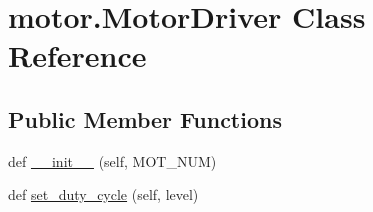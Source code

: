 \hypertarget{classmotor_1_1_motor_driver}{}\section{motor.\+Motor\+Driver Class Reference}
\label{classmotor_1_1_motor_driver}
\subsection*{Public Member Functions}
\begin{DoxyCompactItemize}
\item 
def \mbox{\hyperlink{classmotor_1_1_motor_driver_afdb79336d9a01da3225b1ce463a1b86f}{\+\_\+\+\_\+init\+\_\+\+\_\+}} (self, M\+O\+T\+\_\+\+N\+UM)
\item 
def \mbox{\hyperlink{classmotor_1_1_motor_driver_a51b4721406aa66e0807413199b8b700f}{set\+\_\+duty\+\_\+cycle}} (self, level)
\end{DoxyCompactItemize}
